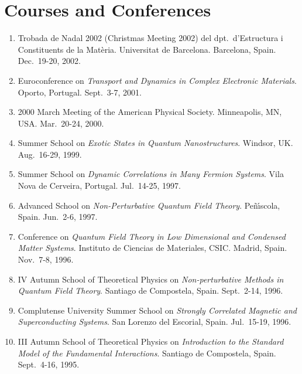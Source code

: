 \documentclass{article}
\begin{document}

\section*{Courses and Conferences}

\begin{enumerate}
\item
Trobada de Nadal 2002 (Christmas Meeting 2002) del dpt.~d'Estructura 
i Constituents de la Mat\`eria. 
Universitat de Barcelona.
Barcelona, Spain.
Dec.~19-20, 2002.

\item
Euroconference on 
{\sl Transport and Dynamics in Complex Electronic Materials}.
Oporto, Portugal. 
Sept.~3-7, 2001. 

\item 
2000 March Meeting of the American Physical Society. 
Minneapolis, MN, USA. 
Mar.~20-24, 2000.

\item 
Summer School on 
{\it Exotic States in Quantum Nanostructures}.
Windsor, UK. 
Aug.~16-29, 1999.

\item 
Summer School on 
{\it Dynamic Correlations in Many Fermion Systems}. 
Vila Nova de Cerveira, Portugal. 
Jul.~14-25, 1997.

\item
Advanced School on {\it Non-Perturbative Quantum Field Theory}. 
Pe\~n\'{\i}scola, Spain. 
Jun.~2-6, 1997.

\item 
Conference on 
{\it Quantum Field Theory in Low Dimensional and Condensed Matter Systems}.
Instituto de Ciencias de Materiales, CSIC. Madrid, Spain. 
Nov.~7-8, 1996.

\item  
IV Autumn School of Theoretical Physics on
{\it Non-perturbative Methods in Quantum Field Theory}.
Santiago de Compostela, Spain. 
Sept.~2-14, 1996.

\item  
Complutense University Summer School on
{\it Strongly Correlated Magnetic and Superconducting Systems}.
San Lorenzo del Escorial, Spain. 
Jul.~15-19, 1996.

\item  
III Autumn School of Theoretical Physics on
{\it Introduction to the Standard Model of the Fundamental Interactions}.
Santiago de Compostela, Spain. 
Sept.~4-16, 1995. 
\end{enumerate}
\end{document}
